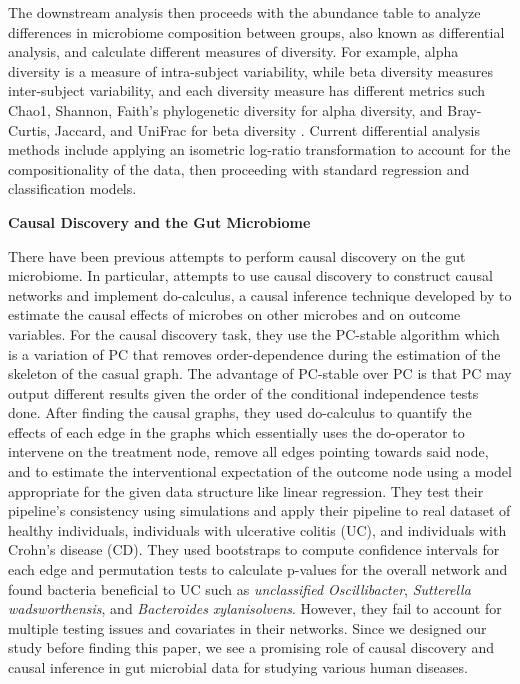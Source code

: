 \documentclass[12pt,letterpaper]{article}
\begin{document}
The downstream analysis then proceeds with the abundance table to analyze differences in microbiome composition between groups, also known as differential analysis, and calculate different measures of diversity. For example, alpha diversity is a measure of intra-subject variability, while beta diversity measures inter-subject variability, and each diversity measure has different metrics such Chao1, Shannon, Faith’s phylogenetic diversity for alpha diversity, and Bray-Curtis, Jaccard, and UniFrac for beta diversity \citep{knight2018bestpractices}. Current differential analysis methods include applying an isometric log-ratio transformation to account for the compositionality of the data, then proceeding with standard regression and classification models. \newline

\textbf{Causal Discovery and the Gut Microbiome}

There have been previous attempts to perform causal discovery on the gut microbiome. In particular, \citep{sazal2021causalgut} attempts to use causal discovery to construct causal networks and implement do-calculus, a causal inference technique developed by \citep{pearl2016primer} to estimate the causal effects of microbes on other microbes and on outcome variables. For the causal discovery task, they use the PC-stable algorithm \citep{colombo2014pcstable} which is a variation of PC that removes order-dependence during the estimation of the skeleton of the casual graph. The advantage of PC-stable over PC is that PC may output different results given the order of the conditional independence tests done. After finding the causal graphs, they used do-calculus to quantify the effects of each edge in the graphs which essentially uses the do-operator to intervene on the treatment node, remove all edges pointing towards said node, and to estimate the interventional expectation of the outcome node using a model appropriate for the given data structure like linear regression. They test their pipeline’s consistency using simulations and apply their pipeline to real dataset of healthy individuals, individuals with ulcerative colitis (UC), and individuals with Crohn’s disease (CD). They used bootstraps to compute confidence intervals for each edge and permutation tests to calculate p-values for the overall network and found bacteria beneficial to UC such as \textit{unclassified Oscillibacter}, \textit{Sutterella wadsworthensis}, and \textit{Bacteroides xylanisolvens}. However, they fail to account for multiple testing issues and covariates in their networks. Since we designed our study before finding this paper, we see a promising role of causal discovery and causal inference in gut microbial data for studying various human diseases. 
\end{document}
